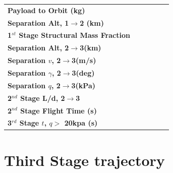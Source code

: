 \begin{table}[htb]
\begin{tabular}{l c c c c c}
		\hline \textbf{Payload to Orbit (kg)}  & \PayloadToOrbitConstq & \PayloadToOrbitFiftykPa & \PayloadToOrbitFortyFivekPa & \PayloadToOrbitFiftyFivekPa & \PayloadToOrbitHighDrag \\ 
		\textbf{Separation Alt, 1$\rightarrow$2 (km)}  & \FirstStageAltConstq & \FirstStageAltFifty & \FirstStageAltFortyFive &  \FirstStageAltFiftyFive &\FirstStageAltHighDrag \\ 
		\textbf{1$^{st}$ Stage Structural Mass Fraction} & \FirstStagesmfConstq & \FirstStagesmfFifty &  \FirstStagesmfFortyFive& \FirstStagesmfFiftyFive  & \FirstStagesmfHighDrag\\ 
		\textbf{Separation Alt, 2$\rightarrow$3(km)}  & \SeparationAltConstq & \SeparationAltFiftykPa & \SeparationAltFortyFivekPa & \SeparationAltFiftyFivekPa & \SeparationAltHighDrag\\ 
		\textbf{Separation $v$, 2$\rightarrow$3(m/s)} & \SeparationvConstq  & \SeparationvFiftykPa & \SeparationvFortyFivekPa &  \SeparationvFiftyFivekPa & \SeparationvHighDrag\\ 
		\textbf{Separation $\gamma$, 2$\rightarrow$3(deg)} & \SeparationAngleConstq& \SeparationAngleFiftykPa &\SeparationAngleFortyFivekPa& \SeparationAngleFiftyFivekPa&\SeparationAngleHighDrag \\ 
		\textbf{Separation $q$, 2$\rightarrow$3(kPa)} & \SeparationqConstq  &\SeparationqFiftykPa&\SeparationqFortyFivekPa &\SeparationqFiftyFivekPa& \SeparationqHighDrag \\ 
		\textbf{2$^{nd}$ Stage L/d, 2$\rightarrow$3} & \SeparationLDConstq&\SeparationLDFiftykPa & \SeparationLDFortyFivekPa & \SeparationLDFiftyFivekPa &\SeparationLDHighDrag\\
		\textbf{2$^{nd}$ Stage Flight Time (s)} & \FlightTimeConstq & \FlightTimeFiftykPa & \FlightTimeFortyFivekPa & \FlightTimeFiftyFivekPa & \FlightTimeHighDrag\\ 
		\textbf{3$^{rd}$ Stage $t$, $q >$ 20kpa (s)} &\toverConstq &\toverFiftykPa &\toverFortyFivekPa &\toverFiftyFivekPa & \toverHighDrag\\ 
		
		
		\hline 
	\end{tabular} 
	
	
	\label{table:Summary}
\end{table}


\section{Third Stage trajectory}

